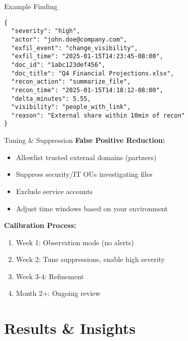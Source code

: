 \documentclass[aspectratio=169]{beamer}
\begin{document}
\begin{frame}[fragile]{Example Finding}
\begin{lstlisting}[basicstyle=\ttfamily\tiny]
{
  "severity": "high",
  "actor": "john.doe@company.com",
  "exfil_event": "change_visibility",
  "exfil_time": "2025-01-15T14:23:45-08:00",
  "doc_id": "1abc123def456",
  "doc_title": "Q4 Financial Projections.xlsx",
  "recon_action": "summarize_file",
  "recon_time": "2025-01-15T14:18:12-08:00",
  "delta_minutes": 5.55,
  "visibility": "people_with_link",
  "reason": "External share within 10min of recon"
}
\end{lstlisting}
\end{frame}

\begin{frame}{Tuning \& Suppression}
\textbf{False Positive Reduction:}
\begin{itemize}
    \item Allowlist trusted external domains (partners)
    \item Suppress security/IT OUs investigating files
    \item Exclude service accounts
    \item Adjust time windows based on your environment
\end{itemize}

\vspace{1em}

\textbf{Calibration Process:}
\begin{enumerate}
    \item Week 1: Observation mode (no alerts)
    \item Week 2: Tune suppressions, enable high severity
    \item Week 3-4: Refinement
    \item Month 2+: Ongoing review
\end{enumerate}
\end{frame}

\section{Results \& Insights}
\end{document}
